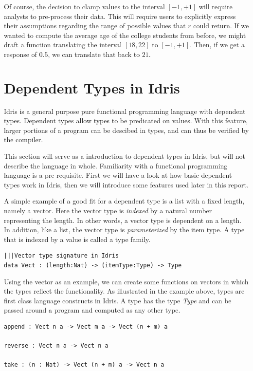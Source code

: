 \documentclass[12pt]{article}
\begin{document}
Of course, the decision to clamp values to the interval $[-1,+1]$ will require analysts to pre-process their data.
This will require users to explicitly express their assumptions regarding the range of possible values that $r$ could return.
If we wanted to compute the average age of the college students from before, we might draft a function translating the interval $[18,22]$ to $[-1,+1]$.
Then, if we get a response of $0.5$, we can translate that back to $21$.

\section{Dependent Types in Idris}\label{sec:dependent_types_in_idris}

Idris is a general purpose pure functional programming language with dependent types.
Dependent types allow types to be predicated on values.
With this feature, larger portions of a program can be descibed in types, and can thus be verified by the compiler.

This section will serve as a introduction to dependent types in Idris, but will not describe the language in whole.
Familiarity with a functional programming language is a pre-requisite.
First we will have a look at how basic dependent types work in Idris, then we will introduce some features used later in this report.

A simple example of a good fit for a dependent type is a list with a fixed length, namely a vector.
Here the vector type is \textit{indexed} by a natural number representing the length.
In other words, a vector type is dependent on a length.
In addition, like a list, the vector type is \textit{parameterized} by the item type.
A type that is indexed by a value is called a type family.

\begin{lstlisting}[caption={Vector Example},label={lst:vector_example}]
|||Vector type signature in Idris
data Vect : (length:Nat) -> (itemType:Type) -> Type
\end{lstlisting}

Using the vector as an example, we can create some functions on vectors in which the types reflect the functionality. As illustrated in the example above, types are first class language constructs in Idris. A type has the type \textit{Type} and can be passed around a program and computed as any other type.

\begin{lstlisting}[caption={Vector Operations Example},label={lst:vector_ops_example}]
append : Vect n a -> Vect m a -> Vect (n + m) a

reverse : Vect n a -> Vect n a

take : (n : Nat) -> Vect (n + m) a -> Vect n a
\end{lstlisting}
\end{document}
